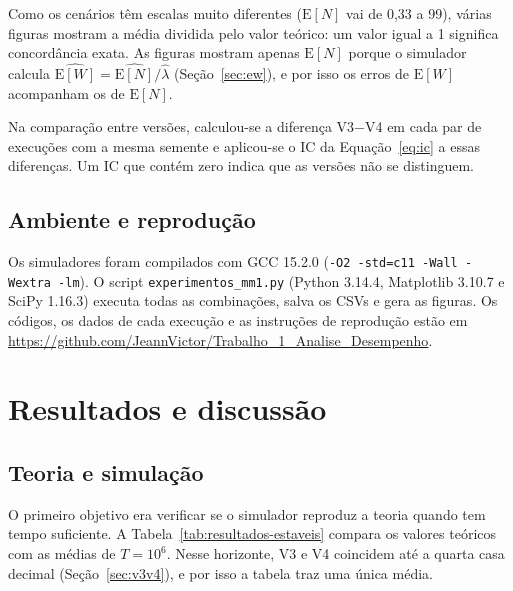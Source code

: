 \documentclass[
  article,      %
  10pt,         %
  oneside,
  a4paper,
  twocolumn,    %
  english,
  brazil        %
]{abntex2}
\newcommand{\EN}{\mathrm{E}[N]}
\newcommand{\EW}{\mathrm{E}[W]}
\begin{document}
Como os cenários têm escalas muito diferentes ($\EN$ vai de 0,33 a 99), várias figuras mostram a média dividida pelo valor teórico: um valor igual a 1 significa concordância exata. As figuras mostram apenas $\EN$ porque o simulador calcula $\widehat{\EW}=\widehat{\EN}/\widehat{\lambda}$ (Seção~\ref{sec:ew}), e por isso os erros de $\EW$ acompanham os de $\EN$.

Na comparação entre versões, calculou-se a diferença V3$-$V4 em cada par de execuções com a mesma semente e aplicou-se o IC da Equação~\ref{eq:ic} a essas diferenças. Um IC que contém zero indica que as versões não se distinguem.

\subsection{Ambiente e reprodução}

Os simuladores foram compilados com GCC 15.2.0 (\texttt{-O2 -std=c11 -Wall -Wextra -lm}). O script \texttt{experimentos\_mm1.py} (Python 3.14.4, Matplotlib 3.10.7 e SciPy 1.16.3) executa todas as combinações, salva os CSVs e gera as figuras. Os códigos, os dados de cada execução e as instruções de reprodução estão em \url{https://github.com/JeannVictor/Trabalho_1_Analise_Desempenho}.


\section{Resultados e discussão}

\subsection{Teoria e simulação}

O primeiro objetivo era verificar se o simulador reproduz a teoria quando tem tempo suficiente. A Tabela~\ref{tab:resultados-estaveis} compara os valores teóricos com as médias de $T=10^6$. Nesse horizonte, V3 e V4 coincidem até a quarta casa decimal (Seção~\ref{sec:v3v4}), e por isso a tabela traz uma única média.
\end{document}
